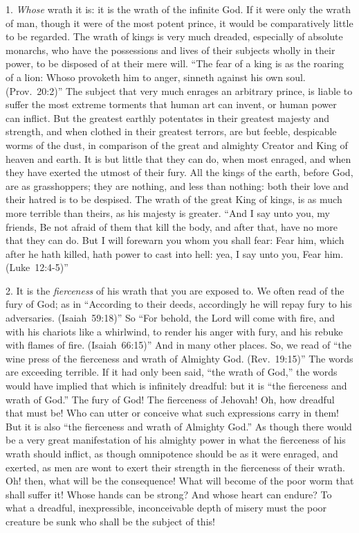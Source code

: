 \documentclass[
]{book}
\begin{document}
1. \emph{Whose} wrath it is: it is the wrath of the infinite God. If it were only the wrath of man, though it were of the most potent prince, it would be comparatively little to be regarded. The wrath of kings is very much dreaded, especially of absolute monarchs, who have the possessions and lives of their subjects wholly in their power, to be disposed of at their mere will. ``The fear of a king is as the roaring of a lion: Whoso provoketh him to anger, sinneth against his own soul. (Prov.~20:2)'' The subject that very much enrages an arbitrary prince, is liable to suffer the most extreme torments that human art can invent, or human power can inflict. But the greatest earthly potentates in their greatest majesty and strength, and when clothed in their greatest terrors, are but feeble, despicable worms of the dust, in comparison of the great and almighty Creator and King of heaven and earth. It is but little that they can do, when most enraged, and when they have exerted the utmost of their fury. All the kings of the earth, before God, are as grasshoppers; they are nothing, and less than nothing: both their love and their hatred is to be despised. The wrath of the great King of kings, is as much more terrible than theirs, as his majesty is greater. ``And I say unto you, my friends, Be not afraid of them that kill the body, and after that, have no more that they can do. But I will forewarn you whom you shall fear: Fear him, which after he hath killed, hath power to cast into hell: yea, I say unto you, Fear him. (Luke~12:4-5)''

2. It is the \emph{fierceness} of his wrath that you are exposed to. We often read of the fury of God; as in ``According to their deeds, accordingly he will repay fury to his adversaries. (Isaiah~59:18)'' So ``For behold, the Lord will come with fire, and with his chariots like a whirlwind, to render his anger with fury, and his rebuke with flames of fire. (Isaiah~66:15)'' And in many other places. So, we read of ``the wine press of the fierceness and wrath of Almighty God. (Rev.~19:15)'' The words are exceeding terrible. If it had only been said, ``the wrath of God,'' the words would have implied that which is infinitely dreadful: but it is ``the fierceness and wrath of God.'' The fury of God! The fierceness of Jehovah! Oh, how dreadful that must be! Who can utter or conceive what such expressions carry in them! But it is also ``the fierceness and wrath of Almighty God.'' As though there would be a very great manifestation of his almighty power in what the fierceness of his wrath should inflict, as though omnipotence should be as it were enraged, and exerted, as men are wont to exert their strength in the fierceness of their wrath. Oh! then, what will be the consequence! What will become of the poor worm that shall suffer it! Whose hands can be strong? And whose heart can endure? To what a dreadful, inexpressible, inconceivable depth of misery must the poor creature be sunk who shall be the subject of this!
\end{document}
